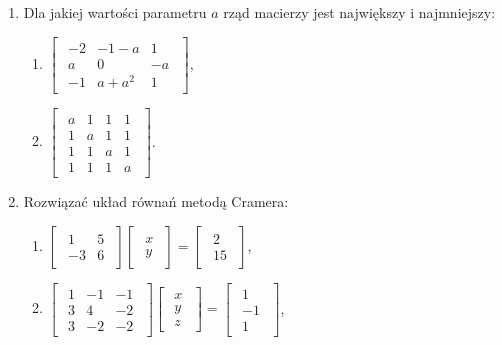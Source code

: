 \documentclass{article}
\begin{document}
\begin{enumerate}
    \item Dla jakiej wartości parametru $a$ rząd macierzy jest największy i najmniejszy:
        \begin{enumerate}
            \item $\begin{bmatrix}\begin{array}{ccc} -2 & -1-a & 1\\ a & 0 & -a\\ -1 & a+a^2 & 1 \end{array}\end{bmatrix}$,
            \item $\begin{bmatrix}\begin{array}{cccc} a & 1 & 1 & 1\\ 1 & a & 1 & 1\\ 1 & 1 & a & 1\\ 1 & 1 & 1 & a \end{array}\end{bmatrix}$.
        \end{enumerate}
        
    \item Rozwiązać układ równań metodą Cramera:
        \begin{enumerate}
            \item $\begin{bmatrix}\begin{array}{rr} 1 & 5\\ -3 & 6 \end{array}\end{bmatrix} \begin{bmatrix}\begin{array}{r} x\\ y \end{array}\end{bmatrix} = \begin{bmatrix}\begin{array}{r} 2\\ 15 \end{array}\end{bmatrix}$,

            \item $\begin{bmatrix}\begin{array}{rrr} 1 & -1 & -1\\ 3 & 4 & -2\\ 3 & -2 & -2 \end{array}\end{bmatrix} \begin{bmatrix}\begin{array}{r} x\\ y\\ z \end{array}\end{bmatrix} = \begin{bmatrix}\begin{array}{r} 1\\ -1\\ 1 \end{array}\end{bmatrix}$,


\end{enumerate}
\end{enumerate}
\end{document}
